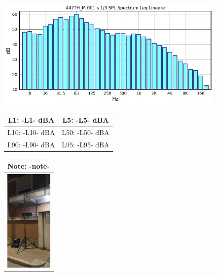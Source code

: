 \documentclass[11pt]{article}
\begin{document}
\begin{figure}[!htb]
   \begin{minipage}{0.6\textwidth}
     \centering
     \includegraphics[width=1.\textwidth]{-SPL!plot-}

	\begin{center}
	\begin{tabular}{|c || c |} 
	 \hline
	 L1: -L1- dBA & L5: -L5- dBA \\ %
	 \hline
	L10: -L10- dBA & L50: -L50- dBA \\ 
	 \hline
	L90: -L90- dBA & L95: -L95- dBA \\ %
	\hline
	\end{tabular}
	\end{center}


	\end{minipage}\hfill
     \begin{minipage}{0.4\textwidth}
	\begin{center}
     	\begin{tabular}{ |p{}|} 
	 \hline
	 \textbf{Note}: \newline -note- \\ 
	 \hline
    \begin{minipage}{.5\textwidth}
    \vspace{0.3cm}
    \hspace{0.8cm}
	\centering
      \includegraphics[height=5cm]{-foto-V.jpg}
     \vspace{0.3cm}
        \end{minipage}	 \\
        	

\end{tabular}
\end{center}
\end{minipage}
\end{figure}
\end{document}

